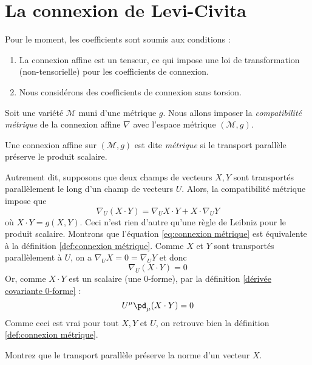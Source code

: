 \section{La connexion de Levi-Civita}
Pour le moment, les coefficients sont soumis aux conditions :
\begin{enumerate}
    \item La connexion affine est un tenseur, ce qui impose une loi de transformation (non-tensorielle) pour les coefficients de connexion.
    \item Nous considérons des coefficients de connexion sans torsion.
\end{enumerate}
Soit une variété $\mathcal{M}$ muni d'une métrique $g$. Nous allons imposer la \emph{compatibilité métrique} de la connexion affine $\nabla$ avec l'espace métrique $(\mathcal{M},g)$.
\begin{theoremframe}
    \begin{defi}
        \label{def:connexion métrique}
        Une connexion affine sur $(\mathcal{M},g)$ est dite \emph{métrique} si le transport parallèle préserve le produit scalaire.
    \end{defi}
\end{theoremframe}
Autrement dit, supposons que deux champs de vecteurs $X,Y$ sont transportés parallèlement le long d'un champ de vecteurs $U$. Alors, la compatibilité métrique impose que
\begin{equation}
\label{eq:connexion métrique}
    \nabla_U (X\cdot Y) = \nabla_U X\cdot Y + X\cdot \nabla_U Y
\end{equation}
où $X\cdot Y = g(X,Y)$. Ceci n'est rien d'autre qu'une règle de Leibniz pour le produit scalaire. Montrons que l'équation \ref{eq:connexion métrique} est équivalente à la 
définition \ref{def:connexion métrique}. Comme $X$ et $Y$ sont transportés parallèlement à $U$, on a $\nabla_U X = 0 = \nabla_U Y$ et donc 
\begin{equation}
    \nabla_U (X\cdot Y) = 0
\end{equation}
Or, comme $X\cdot Y$ est un scalaire (une 0-forme), par la définition \ref{dérivée covariante 0-forme} :
\begin{equation}
    U^\mu \pd_\mu (X\cdot Y) = 0
\end{equation}
Comme ceci est vrai pour tout $X,Y$ et $U$, on retrouve bien la définition \ref{def:connexion métrique}.
\begin{exerc}
    Montrez que le transport parallèle préserve la norme d'un vecteur $X$.
\end{exerc}
